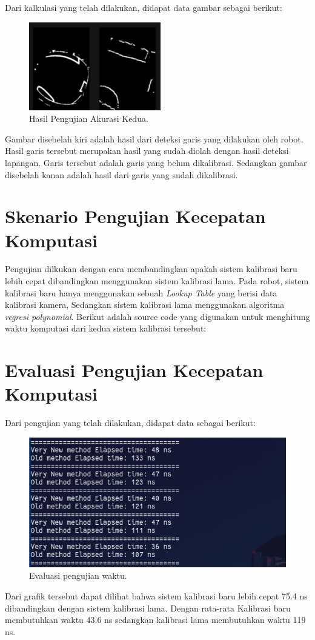 Dari kalkulasi yang telah dilakukan, didapat data gambar sebagai berikut:

\begin{figure}[H]
  \centering
  \includegraphics[scale=1.2]{gambar/cam_raw2.jpg}
  \caption{Hasil Pengujian Akurasi Kedua.}
  \label{fig:hasilpengujian}
\end{figure}

Gambar disebelah kiri adalah hasil dari deteksi garis yang dilakukan oleh robot. Hasil garis tersebut merupakan hasil yang sudah diolah dengan hasil deteksi lapangan. Garis tersebut adalah garis yang belum dikalibrasi. Sedangkan gambar disebelah kanan adalah hasil dari garis yang sudah dikalibrasi. 

\section{Skenario Pengujian Kecepatan Komputasi}
\label{sec:analisispengujian}

Pengujian dilkukan dengan cara membandingkan apakah sistem kalibrasi baru lebih cepat dibandingkan menggunakan sistem kalibrasi lama. Pada robot, sistem kalibrasi baru hanya menggunakan sebuah \emph{Lookup Table} yang berisi data kalibrasi kamera, Sedangkan sistem kalibrasi lama menggunakan algoritma \emph{regresi polynomial}. Berikut adalah source code yang digunakan untuk menghitung waktu komputasi dari kedua sistem kalibrasi tersebut: 



\section{Evaluasi Pengujian Kecepatan Komputasi}
\label{sec:analisispengujian}

Dari pengujian yang telah dilakukan, didapat data sebagai berikut: 
\begin{figure}[H]
  \centering
  \includegraphics[scale=0.9]{gambar/beda_waktu.png}
  \caption{Evaluasi pengujian waktu.}
  \label{fig:ujiwaktu}
\end{figure}

Dari grafik tersebut dapat dilihat bahwa sistem kalibrasi baru lebih cepat 75.4 ns dibandingkan dengan sistem kalibrasi lama. Dengan rata-rata Kalibrasi baru membutuhkan waktu 43.6 ns sedangkan kalibrasi lama membutuhkan waktu 119 ns. 
